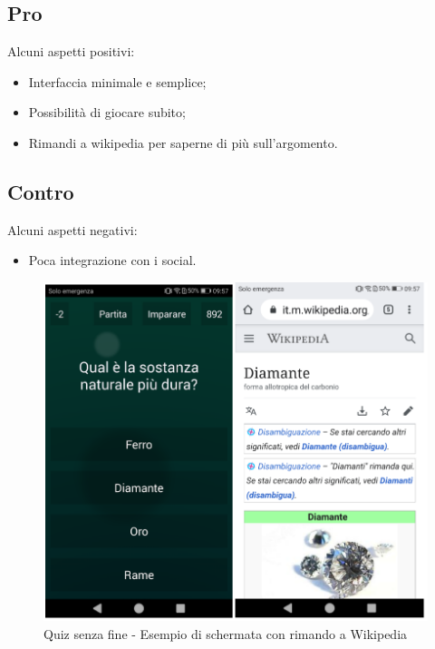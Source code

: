 \documentclass{article}
\begin{document}
\subsection{Pro}
Alcuni aspetti positivi:
\begin{itemize}
\item Interfaccia minimale e semplice;
\item Possibilità di giocare subito;
\item Rimandi a wikipedia per saperne di più sull’argomento.
\end{itemize}

\subsection{Contro}
Alcuni aspetti negativi:
\begin{itemize}
\item Poca integrazione con i social.
\end{itemize}

\begin{figure}[htp]
\begin{center}
\includegraphics[width=1 \textwidth]{Figure8.png}
\caption{Quiz senza fine - Esempio di schermata con rimando a Wikipedia}
\end{center}
\end{figure}
\end{document}
